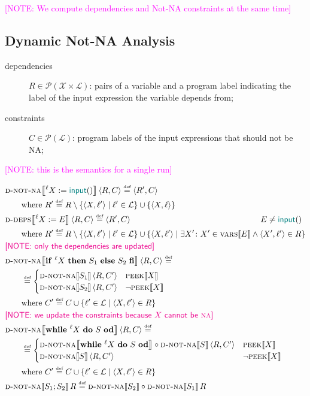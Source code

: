 \documentclass{article}
\newcommand{\defined}{\ensuremath{\stackrel{\mbox{\tiny def}}{=}}\xspace} %
\newcommand{\vars}{\ensuremath{\mathcal{X}}\xspace} %
\newcommand{\ipt}{\ensuremath{\mathbf{\mathsf{\color{teal}input}}()}\xspace} %
\newcommand{\powerset}[1]{\ensuremath{\mathcal{P}\left(#1\right)}\xspace} %
\newcommand{\tuple}[2]{\ensuremath{\langle #1, #2 \rangle}\xspace} %
\newcommand{\labels}{\ensuremath{\mathcal{L}}\xspace} %
\newcommand{\semantics}[1]{\ensuremath{\left\llbracket #1 \right\rrbracket}\xspace} %
\newcommand{\ddeps}[1]{\ensuremath{\textsc{d-deps}\!\semantics{#1}}\xspace} %
\newcommand{\ids}[1]{\ensuremath{\textsc{vars}\!\semantics{#1}}\xspace} %
\newcommand{\peek}[1]{\ensuremath{\textsc{peek}\!\semantics{#1}}\xspace} %
\newcommand{\dnna}[1]{\ensuremath{\textsc{d-not-na}\!\semantics{#1}}\xspace} %
\newcommand{\irem}[3]{{\noindent\textcolor{#1}{\textsf{[#2: 
#3]}}}}
\newcommand{\note}[1]{\irem{magenta}{NOTE}{#1}}
\begin{document}
\note{We compute dependencies and Not-NA constraints at the same time}
	
\subsection*{Dynamic Not-NA Analysis}


\begin{description}
\item[dependencies] $R \in \powerset{\vars \times \labels}$: pairs of a variable and a program label indicating the label of the input expression the variable depends from;
\item[constraints] $C \in \powerset{\labels}$: program labels of the input expressions that should not be NA; 
\end{description}

\note{this is the semantics for a single run}

	\begin{align*}
	&\dnna{^\ell{}X := \ipt}\tuple{R}{C} \defined \tuple{R'}{C} \\
	&\qquad\mbox{where } R' \defined R \setminus \{ \tuple{X}{\ell{}'} \mid \ell{}' \in \labels \} \cup \{ \tuple{X}{\ell{}} \} 
	\\
	&\ddeps{^\ell{}X := E}\tuple{R}{C} \defined \tuple{R'}{C} \qquad\qquad\qquad\qquad\qquad\qquad\qquad\qquad E \not= \ipt\\
	&\qquad\mbox{where } R' \defined R \setminus \{ \tuple{X}{\ell{}'} \mid \ell{}' \in \labels \} \cup \{ \tuple{X}{\ell{}'} \mid \exists X'\colon X' \in \ids{E} \land \tuple{X'}{\ell{}'} \in R \} \\
%
	&\note{only the dependencies are updated} \\
%
	&\dnna{\mathsf{\mathbf{if}}~^\ell{}X~\mathsf{\mathbf{then}}~S_1~\mathsf{\mathbf{else}}~S_2~\mathsf{\mathbf{fi}}}\tuple{R}{C} \defined \\
	 &\qquad\defined  \begin{cases} \dnna{S_1}\tuple{R}{C'} & \peek{X} \\
	  \dnna{S_2}\tuple{R}{C'} & \neg \peek{X} \end{cases} \\ 
	  &\qquad\mbox{where } C' \defined C \cup \{\ell{}' \in \labels \mid \tuple{X}{\ell{}'} \in R \} \\ 
	  &\note{we update the constraints because $X$ cannot be \textsc{na}} \\
%
&\dnna{\mathsf{\mathbf{while}}~^\ell{}X~\mathsf{\mathbf{do}}~S~\mathsf{\mathbf{od}}} \tuple{R}{C}
\defined \\
&\qquad\defined \begin{cases} \dnna{\mathsf{\mathbf{while}}~^\ell{}X~\mathsf{\mathbf{do}}~S~\mathsf{\mathbf{od}}} \circ \dnna{S}\tuple{R}{C'} & \peek{X} \\
	  \dnna{S}\tuple{R}{C'} & \neg \peek{X} \end{cases} \\ 
	  &\qquad\mbox{where } C' \defined C \cup \{\ell{}' \in \labels \mid \tuple{X}{\ell{}'} \in R \} \\ 
%
&\dnna{S_1; S_2}R \defined \dnna{S_2} \circ 
\dnna{S_1}R
	\end{align*}
\end{document}
